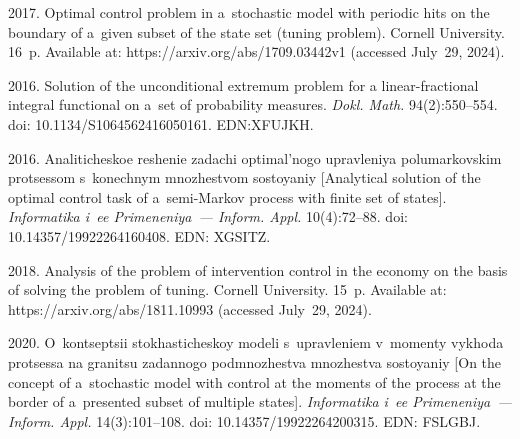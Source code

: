 



    




  \begin{multicols}{2}

\renewcommand{\bibname}{\protect\rmfamily References}

{\small\frenchspacing
 {%
 \begin{thebibliography}{9} 
 2017. Optimal control problem in a~stochastic model with periodic hits on the boundary
 of a~given subset of the state set (tuning problem).  Cornell University. 16~p. Available at: 
 {\sf https://arxiv.org/abs/1709.03442v1} (accessed July~29, 2024).

 2016. 
Solution of the unconditional extremum problem for a linear-fractional integral functional on a~set of probability measures. 
\textit{Dokl. Math.} 94(2):550--554. 
doi: 10.1134/S1064562416050161. EDN:\linebreak XFUJKH.

 2016. 
Analiticheskoe reshenie zadachi optimal'nogo upravleniya polumarkovskim protsessom s~konechnym mnozhestvom sostoyaniy 
[Analytical solution of the optimal control task of a~semi-Markov process with finite set of states]. 
\textit{Informatika i~ee Primeneniya~--- Inform. Appl.} 10(4):72--88.
doi: 10.14357/19922264160408. EDN: XGSITZ.

 2018. 
Analysis of the problem of intervention control in the economy on the basis of solving the problem of tuning. Cornell University. 15~p.
Available at: {\sf https://arxiv.org/abs/1811.10993} (accessed July~29, 2024).

 2020.
O~kon\-tsep\-tsii sto\-kha\-sti\-che\-skoy modeli s~uprav\-le\-niem v~mo\-men\-ty vykhoda pro\-tses\-sa na gra\-ni\-tsu 
za\-dan\-no\-go pod\-mno\-zhest\-va mno\-zhest\-va so\-sto\-yaniy
[On the concept of a~stochastic model with control at the moments of the process at the border of a~presented subset of multiple states].
\textit{Informatika i~ee Primeneniya~--- Inform. Appl.} 14(3):101--108.
doi: 10.14357/19922264200315. EDN: FSLGBJ.


\end{thebibliography}}}
\end{multicols}
